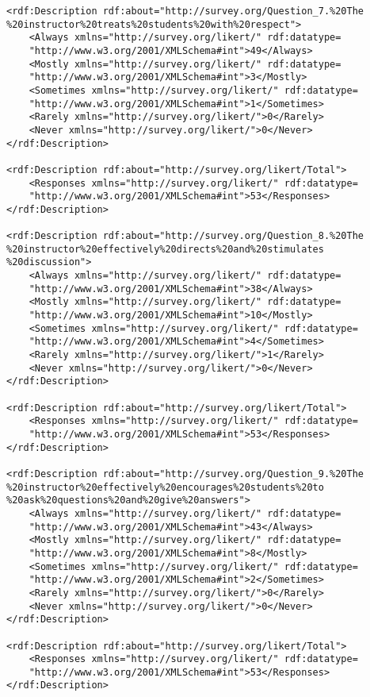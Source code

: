 \begin{lstlisting}
<rdf:Description rdf:about="http://survey.org/Question_7.%20The
%20instructor%20treats%20students%20with%20respect">
	<Always xmlns="http://survey.org/likert/" rdf:datatype=
	"http://www.w3.org/2001/XMLSchema#int">49</Always>
	<Mostly xmlns="http://survey.org/likert/" rdf:datatype=
	"http://www.w3.org/2001/XMLSchema#int">3</Mostly>
	<Sometimes xmlns="http://survey.org/likert/" rdf:datatype=
	"http://www.w3.org/2001/XMLSchema#int">1</Sometimes>
	<Rarely xmlns="http://survey.org/likert/">0</Rarely>
	<Never xmlns="http://survey.org/likert/">0</Never>
</rdf:Description>

<rdf:Description rdf:about="http://survey.org/likert/Total">
	<Responses xmlns="http://survey.org/likert/" rdf:datatype=
	"http://www.w3.org/2001/XMLSchema#int">53</Responses>
</rdf:Description>

<rdf:Description rdf:about="http://survey.org/Question_8.%20The
%20instructor%20effectively%20directs%20and%20stimulates
%20discussion">
	<Always xmlns="http://survey.org/likert/" rdf:datatype=
	"http://www.w3.org/2001/XMLSchema#int">38</Always>
	<Mostly xmlns="http://survey.org/likert/" rdf:datatype=
	"http://www.w3.org/2001/XMLSchema#int">10</Mostly>
	<Sometimes xmlns="http://survey.org/likert/" rdf:datatype=
	"http://www.w3.org/2001/XMLSchema#int">4</Sometimes>
	<Rarely xmlns="http://survey.org/likert/">1</Rarely>
	<Never xmlns="http://survey.org/likert/">0</Never>
</rdf:Description>

<rdf:Description rdf:about="http://survey.org/likert/Total">
	<Responses xmlns="http://survey.org/likert/" rdf:datatype=
	"http://www.w3.org/2001/XMLSchema#int">53</Responses>
</rdf:Description>

<rdf:Description rdf:about="http://survey.org/Question_9.%20The
%20instructor%20effectively%20encourages%20students%20to
%20ask%20questions%20and%20give%20answers">
	<Always xmlns="http://survey.org/likert/" rdf:datatype=
	"http://www.w3.org/2001/XMLSchema#int">43</Always>
	<Mostly xmlns="http://survey.org/likert/" rdf:datatype=
	"http://www.w3.org/2001/XMLSchema#int">8</Mostly>
	<Sometimes xmlns="http://survey.org/likert/" rdf:datatype=
	"http://www.w3.org/2001/XMLSchema#int">2</Sometimes>
	<Rarely xmlns="http://survey.org/likert/">0</Rarely>
	<Never xmlns="http://survey.org/likert/">0</Never>
</rdf:Description>

<rdf:Description rdf:about="http://survey.org/likert/Total">
	<Responses xmlns="http://survey.org/likert/" rdf:datatype=
	"http://www.w3.org/2001/XMLSchema#int">53</Responses>
</rdf:Description>


\end{lstlisting}
